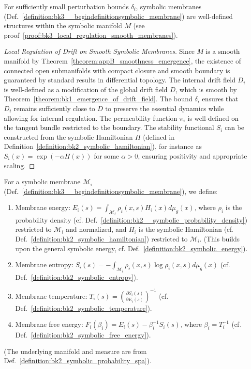 \begin{lemma} \label{lemma:bk3__beginlemmawell_posedness_of_symbolic_me}
For sufficiently small perturbation bounds $\delta_i$, symbolic membranes (Def.~\ref{definition:bk3__begindefinitionsymbolic_membrane}) are well-defined structures within the symbolic manifold $M$ (see proof~\ref{proof:bk3_local_regulation_smooth_membranes}).
\end{lemma}

\begin{proof}[Local Regulation of Drift on Smooth Symbolic Membranes]
\label{proof:bk3_local_regulation_smooth_membranes}
Since $M$ is a smooth manifold by Theorem~\ref{theorem:appB_smoothness_emergence}, the existence of connected open submanifolds with compact closure and smooth boundary is guaranteed by standard results in differential topology. The internal drift field $D_i$ is well-defined as a modification of the global drift field $D$, which is smooth by Theorem~\ref{theorem:bk1_emergence_of_drift_field}. The bound $\delta_i$ ensures that $D_i$ remains sufficiently close to $D$ to preserve the essential dynamics while allowing for internal regulation. The permeability function $\pi_i$ is well-defined on the tangent bundle restricted to the boundary. The stability functional $S_i$ can be constructed from the symbolic Hamiltonian $H$ (defined in Definition~\ref{definition:bk2_symbolic_hamiltonian}), for instance as $S_i(x) = \exp(-\alpha H(x))$ for some $\alpha > 0$, ensuring positivity and appropriate scaling.
\end{proof}

\begin{definition} \label{definition:bk3_membrane_thermodynamics}
For a symbolic membrane $\mathcal{M}_i$ (Def.~\ref{definition:bk3__begindefinitionsymbolic_membrane}), we define:
\begin{enumerate}
    \item Membrane energy: $E_i(s) = \int_{\mathcal{M}_i} \rho_i(x,s)H_i(x)d\mu_g(x)$, where $\rho_i$ is the probability density (cf. Def.~\ref{definition:bk2__symbolic_probability_density}) restricted to $\mathcal{M}_i$ and normalized, and $H_i$ is the symbolic Hamiltonian (cf. Def.~\ref{definition:bk2_symbolic_hamiltonian}) restricted to $\mathcal{M}_i$. (This builds upon the general symbolic energy, cf. Def.~\ref{definition:bk2_symbolic_energy}).
    \item Membrane entropy: $S_i(s) = -\int_{\mathcal{M}_i} \rho_i(x,s)\log\rho_i(x,s)d\mu_g(x)$ (cf. Def.~\ref{definition:bk2_symbolic_entropy}).
    \item Membrane temperature: $T_i(s) = \left(\frac{\partial S_i(s)}{\partial E_i(s)}\right)^{-1}$ (cf. Def.~\ref{definition:bk2_symbolic_temperature}).
    \item Membrane free energy: $F_i(\beta_i) = E_i(s) - \beta_i^{-1}S_i(s)$, where $\beta_i = T_i^{-1}$ (cf. Def.~\ref{definition:bk2_symbolic_free_energy}).
\end{enumerate}
(The underlying manifold and measure are from Def.~\ref{definition:bk2_symbolic_probability_spa}).
\end{definition}

